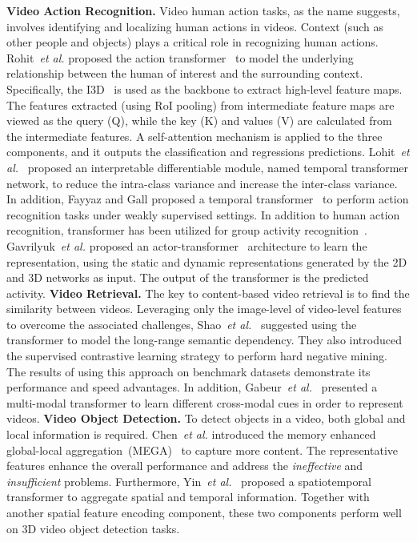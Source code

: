 \noindent\textbf{Video Action Recognition.} Video human action tasks, as the name suggests, involves identifying and localizing human actions in videos. Context (such as other people and objects) plays a critical role in recognizing human actions. Rohit~\emph{et al.} proposed the action transformer~ to model the underlying relationship between the human of interest and the surrounding context. Specifically, the I3D~ is used as the backbone to extract high-level feature maps. The features extracted (using RoI pooling) from intermediate feature maps are viewed as the query (Q), while the key (K) and values (V) are calculated from the intermediate features. A self-attention mechanism is applied to the three components, and it outputs the classification and regressions predictions. Lohit~\emph{et al.}~ proposed an interpretable differentiable module, named temporal transformer network, to reduce the intra-class variance and increase the inter-class variance. In addition, Fayyaz and Gall proposed a temporal transformer~ to perform action recognition tasks under weakly supervised settings. In addition to human action recognition, transformer has been utilized for group activity recognition~. Gavrilyuk~\emph{et al.} proposed an actor-transformer~ architecture to learn the representation, using the static and dynamic representations generated by the 2D and 3D networks as input. The output of the transformer is the predicted activity.
\noindent\textbf{Video Retrieval.} The key to content-based video retrieval is to find the similarity between videos. Leveraging only the image-level of video-level features to overcome the associated challenges, Shao~\emph{et al.}~ suggested using the transformer to model the long-range semantic dependency. They also introduced the supervised contrastive learning strategy to perform hard negative mining. The results of using this approach on benchmark datasets demonstrate its performance and speed advantages. In addition, Gabeur~\emph{et al.}~ presented a multi-modal transformer to learn different cross-modal cues in order to represent videos.
\noindent\textbf{Video Object Detection.} To detect objects in a video, both global and local information is required. Chen~\emph{et al.} introduced the memory enhanced global-local aggregation~(MEGA)~ to capture more content. The representative features enhance the overall performance and address the \emph{ineffective} and \emph{insufficient} problems. Furthermore, Yin~\emph{et al.}~ proposed a spatiotemporal transformer to aggregate spatial and temporal information. Together with another spatial feature encoding component, these two components perform well on 3D video object detection tasks.
